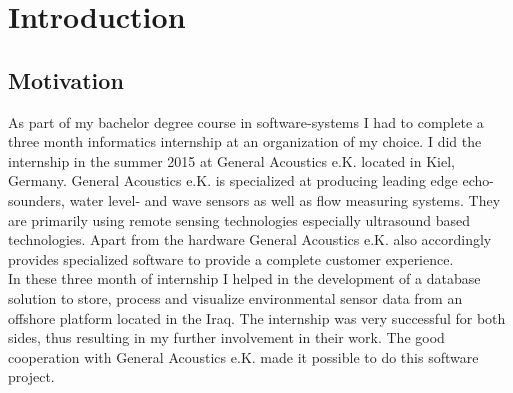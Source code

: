 \chapter{Introduction}

\section{Motivation}
As part of my bachelor degree course in software-systems I had to complete a three month informatics internship at an organization of my choice. I did the internship in the summer 2015 at General Acoustics e.K. located in Kiel, Germany. General Acoustics e.K. is specialized at producing leading edge echo-sounders, water level- and wave sensors as well as flow measuring systems. They are primarily using remote sensing technologies especially ultrasound based technologies. Apart from the hardware General Acoustics e.K. also accordingly provides specialized software to provide a complete customer experience.\\
In these three month of internship I helped in the development of a database solution to store, process and visualize environmental sensor data from an offshore platform located in the Iraq. The internship was very successful for both sides, thus resulting in my further involvement in their work. The good cooperation with General Acoustics e.K. made it possible to do this software project.%

